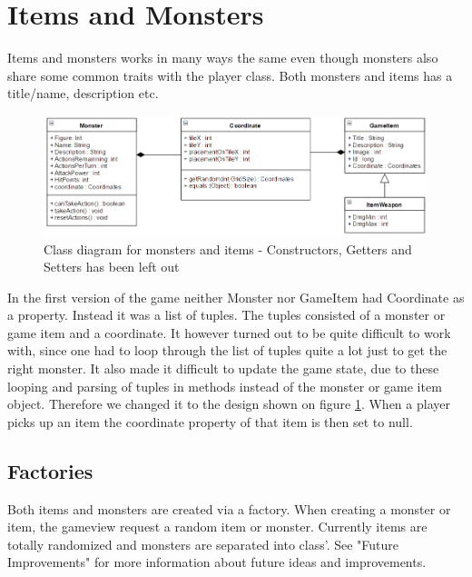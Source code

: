 \section{Items and Monsters}

Items and monsters works in many ways the same even though monsters also share some common traits with the player class.
Both monsters and items has a title/name, description etc.

\begin{figure}[ht!]
	\centering
	\includegraphics[width=130mm]{images/itemsAndMonstersDiagram.png}
	\caption{Class diagram for monsters and items - Constructors, Getters and Setters has been left out}
	\label{fig:itemsAndMonstersDiagram}
\end{figure}

In the first version of the game neither Monster nor GameItem had Coordinate as a property. Instead it was a list of tuples. The tuples consisted of a monster or game item and a coordinate. It however turned out to be quite difficult to work with, since one had to loop through the list of tuples quite a lot just to get the right monster. It also made it difficult to update the game state, due to these looping and parsing of tuples in methods instead of the monster or game item object. Therefore we changed it to the design shown on figure \ref{fig:itemsAndMonstersDiagram}. When a player picks up an item the coordinate property of that item is then set to null. \\

\subsection{Factories}
Both items and monsters are created via a factory. When creating a monster or item, the gameview request a random item or monster. Currently items are totally randomized and monsters are separated into class'. See "Future Improvements" for more information about future ideas and improvements.
